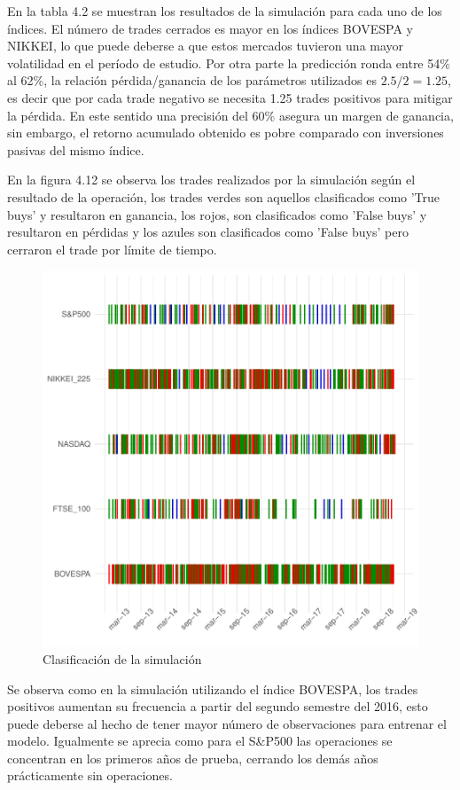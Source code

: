 \documentclass[a4paper,12pt]{Latex/Classes/PhDthesisPSnPDF}
\begin{document}
En la tabla 4.2 se muestran los resultados de la simulación para cada uno de los índices. El número de trades cerrados es mayor en los índices BOVESPA y NIKKEI, lo que puede deberse a que estos mercados tuvieron una mayor volatilidad en el período de estudio. Por otra parte la predicción ronda entre 54\% al 62\%, la relación pérdida/ganancia de los parámetros utilizados es $2.5/2 = 1.25$, es decir que por cada trade negativo se necesita 1.25 trades positivos para mitigar la pérdida. En este sentido una precisión del 60\% asegura un margen de ganancia, sin embargo, el retorno acumulado obtenido es pobre comparado con inversiones pasivas del mismo índice.
 

En la figura 4.12 se observa los trades realizados por la simulación según el resultado de la operación, los trades verdes son aquellos clasificados como 'True buys' y resultaron en ganancia, los rojos, son clasificados como 'False buys' y resultaron en pérdidas y los azules son clasificados como 'False buys' pero cerraron el trade por límite de tiempo.

\begin{figure}[H]
\centering
\includegraphics{main-029}
\caption{Clasificación de la simulación}
\end{figure}

Se observa como en la simulación utilizando el índice BOVESPA, los trades positivos aumentan su frecuencia a partir del segundo semestre del 2016, esto puede deberse al hecho de tener mayor número de observaciones para entrenar el modelo. Igualmente se aprecia como para el S\&P500 las operaciones se concentran en los primeros años de prueba, cerrando los demás años prácticamente sin operaciones.
\end{document}
